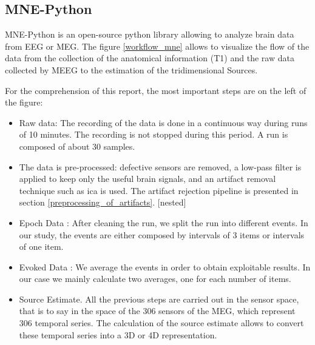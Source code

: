 \subsection{MNE-Python}

MNE-Python \cite{GramfortEtAl2013a} is an open-source python library allowing to analyze brain data from EEG or MEG. The figure \ref{workflow_mne} allows to visualize the flow of the data from the collection of the anatomical information (T1) and the raw data collected by MEEG to the estimation of the tridimensional Sources.

For the comprehension of this report, the most important steps are on the left of the figure:

\begin{itemize}
    \item Raw data: The recording of the data is done in a continuous way during runs of 10 minutes. The recording is not stopped during this period. A run is composed of about 30 samples.
    \item The data is pre-processed: defective sensors are removed, a low-pass filter is applied to keep only the useful brain signals, and an artifact removal technique such as ica is used. The artifact rejection pipeline is presented in section \ref{preprocessing_of_artifacts}. [nested]
    \item Epoch Data : After cleaning the run, we split the run into different events. In our study, the events are either composed by intervals of 3 items or intervals of one item.
    \item Evoked Data : We average the events in order to obtain exploitable results. In our case we mainly calculate two averages, one for each number of items.
    \item Source Estimate. All the previous steps are carried out in the sensor space, that is to say in the space of the 306 sensors of the MEG, which represent 306 temporal series. The calculation of the source estimate allows to convert these temporal series into a 3D or 4D representation.
\end{itemize}


